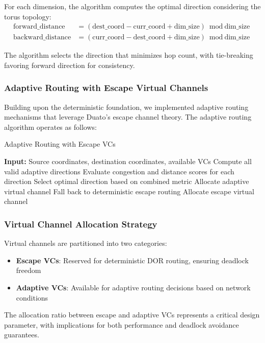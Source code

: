 \documentclass[a4paper,12pt]{article}
\begin{document}
For each dimension, the algorithm computes the optimal direction considering the torus topology:
\begin{align}
\text{forward\_distance} &= (\text{dest\_coord} - \text{curr\_coord} + \text{dim\_size}) \bmod \text{dim\_size} \\
\text{backward\_distance} &= (\text{curr\_coord} - \text{dest\_coord} + \text{dim\_size}) \bmod \text{dim\_size}
\end{align}

The algorithm selects the direction that minimizes hop count, with tie-breaking favoring forward direction for consistency.

\subsubsection{Adaptive Routing with Escape Virtual Channels}
Building upon the deterministic foundation, we implemented adaptive routing mechanisms that leverage Duato's escape channel theory. The adaptive routing algorithm operates as follows:

\begin{algorithm}
\caption{Adaptive Routing with Escape VCs}
\begin{algorithmic}[1]
\State \textbf{Input:} Source coordinates, destination coordinates, available VCs
    \State Compute all valid adaptive directions
    \State Evaluate congestion and distance scores for each direction
    \State Select optimal direction based on combined metric
    \State Allocate adaptive virtual channel
\Else
    \State Fall back to deterministic escape routing
    \State Allocate escape virtual channel
\EndIf
\end{algorithmic}
\end{algorithm}

\subsubsection{Virtual Channel Allocation Strategy}
Virtual channels are partitioned into two categories:
\begin{itemize}
    \item \textbf{Escape VCs}: Reserved for deterministic DOR routing, ensuring deadlock freedom
    \item \textbf{Adaptive VCs}: Available for adaptive routing decisions based on network conditions
\end{itemize}

The allocation ratio between escape and adaptive VCs represents a critical design parameter, with implications for both performance and deadlock avoidance guarantees.
\end{document}
